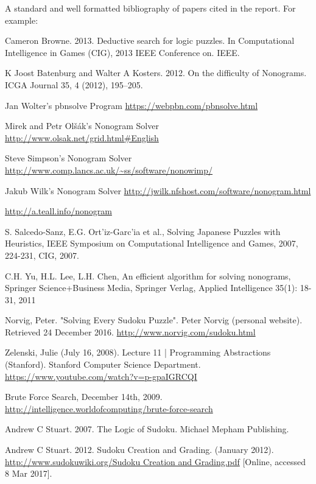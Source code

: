 \documentclass{svproc}
\begin{document}
A standard and well formatted bibliography of papers cited in the report. For example:

\begin{thebibliography}{6}

Cameron Browne. 2013. Deductive search for logic puzzles. In Computational
Intelligence in Games (CIG), 2013 IEEE Conference on. IEEE.

K Joost Batenburg and Walter A Kosters. 2012. On the difficulty of Nonograms.
ICGA Journal 35, 4 (2012), 195–205.

Jan Wolter's pbnsolve Program
\url{https://webpbn.com/pbnsolve.html}

Mirek and Petr Olšák's Nonogram Solver
\url{http://www.olsak.net/grid.html#English}

Steve Simpson's Nonogram Solver
\url{http://www.comp.lancs.ac.uk/~ss/software/nonowimp/}

Jakub Wilk's Nonogram Solver
\url{http://jwilk.nfshost.com/software/nonogram.html}

\url{http://a.teall.info/nonogram}

S. Salcedo-Sanz, E.G. Ort’iz-Garc’ia et al., Solving Japanese Puzzles with
Heuristics, IEEE Symposium on Computational Intelligence and Games,
2007, 224-231, CIG, 2007.

C.H. Yu, H.L. Lee, L.H. Chen, An efficient algorithm for solving nonograms, Springer Science+Business Media, Springer Verlag, Applied Intelligence 35(1): 18-31, 2011

Norvig, Peter. "Solving Every Sudoku Puzzle". Peter Norvig (personal website). Retrieved 24 December 2016.
\url{http://www.norvig.com/sudoku.html}

Zelenski, Julie (July 16, 2008). Lecture 11 | Programming Abstractions (Stanford). Stanford Computer Science Department.
\url{https://www.youtube.com/watch?v=p-gpaIGRCQI}

Brute Force Search, December 14th, 2009.
\url{http://intelligence.worldofcomputing/brute-force-search}

Andrew C Stuart. 2007. The Logic of Sudoku. Michael Mepham Publishing.

Andrew C Stuart. 2012. Sudoku Creation and Grading. (January 2012).
\url{http://www.sudokuwiki.org/Sudoku Creation and Grading.pdf}
[Online, accessed 8 Mar 2017].


\end{thebibliography}
\end{document}
